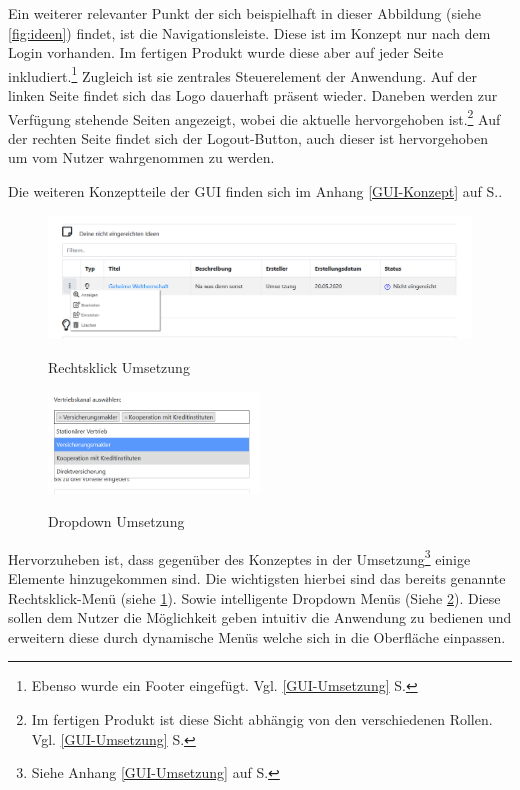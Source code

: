 Ein weiterer relevanter Punkt der sich beispielhaft in dieser Abbildung (siehe \cref{fig:ideen}) findet, ist die Navigationsleiste. Diese ist im Konzept nur nach dem Login vorhanden. Im fertigen Produkt wurde diese aber auf jeder Seite inkludiert.\footnote{Ebenso wurde ein Footer eingefügt. Vgl. \ref{GUI-Umsetzung} S.\pageref{GUI-Umsetzung}}
Zugleich ist sie zentrales Steuerelement der Anwendung. Auf der linken Seite findet sich das Logo dauerhaft präsent wieder. Daneben werden zur Verfügung stehende Seiten angezeigt, wobei die aktuelle hervorgehoben ist.\footnote{Im fertigen Produkt ist diese Sicht abhängig von den verschiedenen Rollen. Vgl. \ref{GUI-Umsetzung} S.\pageref{GUI-Umsetzung}} Auf der rechten Seite findet sich der Logout-Button, auch dieser ist hervorgehoben um vom Nutzer wahrgenommen zu werden.

Die weiteren Konzeptteile der GUI finden sich im Anhang \ref{GUI-Konzept} auf S.\pageref{GUI-Konzept}.

\begin{figure}[h!!]
    \centering
    \begin{minipage}[t]{1\textwidth}
        \caption{Rechtsklick Umsetzung}
        \includegraphics[width=1\textwidth]{img/rechtsklick-umsetzung.png}\\
        \label{fig:rechtsklick}
    \end{minipage}
\end{figure}

\begin{figure}[h!!]
    \centering
    \begin{minipage}[t]{1\textwidth}
        \caption{Dropdown Umsetzung}
        \includegraphics[width=0.5\textwidth]{img/dropdown-umsetzung.png}\\
        \label{fig:dropdown}
    \end{minipage}
\end{figure}

Hervorzuheben ist, dass gegenüber des Konzeptes in der Umsetzung\footnote{Siehe Anhang \ref{GUI-Umsetzung} auf S. \pageref{GUI-Umsetzung}} einige Elemente hinzugekommen sind. Die wichtigsten hierbei sind das bereits genannte Rechtsklick-Menü (siehe \cref{fig:rechtsklick}). Sowie intelligente Dropdown Menüs (Siehe \cref{fig:dropdown}).
Diese sollen dem Nutzer die Möglichkeit geben intuitiv die Anwendung zu bedienen und erweitern diese durch dynamische Menüs welche sich in die Oberfläche einpassen.
